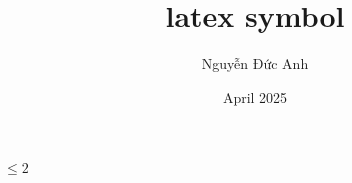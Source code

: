\documentclass{article}
\title{latex symbol}
\author{Nguyễn Đức Anh}
\date{April 2025}
\begin{document}
$\le2$
\end{document}
